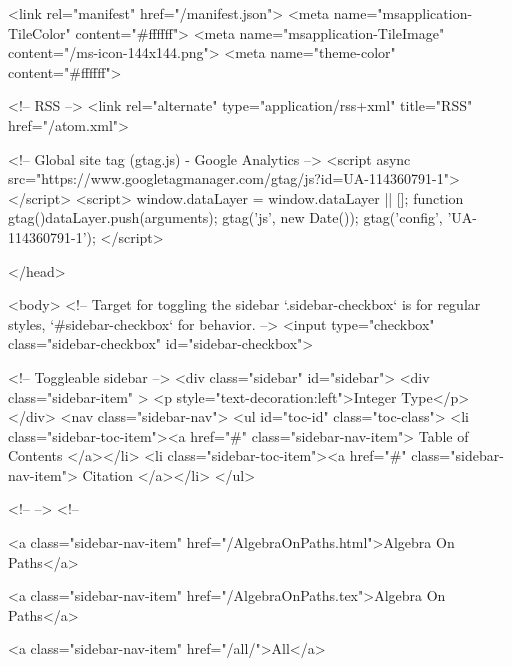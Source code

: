   <link rel="manifest" href="/manifest.json">
  <meta name="msapplication-TileColor" content="#ffffff">
  <meta name="msapplication-TileImage" content="/ms-icon-144x144.png">
  <meta name="theme-color" content="#ffffff">
  
  <!-- RSS -->
  <link rel="alternate" type="application/rss+xml" title="RSS" href="/atom.xml">

  <!-- Global site tag (gtag.js) - Google Analytics -->
  <script async src="https://www.googletagmanager.com/gtag/js?id=UA-114360791-1"></script>
  <script>
    window.dataLayer = window.dataLayer || [];
    function gtag(){dataLayer.push(arguments);}
    gtag('js', new Date());
    gtag('config', 'UA-114360791-1');
  </script>

  
</head>




  <body>
    <!-- Target for toggling the sidebar `.sidebar-checkbox` is for regular
     styles, `#sidebar-checkbox` for behavior. -->
<input type="checkbox" class="sidebar-checkbox" id="sidebar-checkbox">

<!-- Toggleable sidebar -->
<div class="sidebar" id="sidebar">
  <div class="sidebar-item" >
    <p style="text-decoration:left">Integer Type</p>
  </div>
  <nav class="sidebar-nav">
    <ul id="toc-id" class="toc-class">
  <li class="sidebar-toc-item"><a href="#" class="sidebar-nav-item"> Table of Contents </a></li>
  <li class="sidebar-toc-item"><a href="#" class="sidebar-nav-item"> Citation </a></li>
</ul>


    <!--  -->
    <!-- 
      
    
      
    
      
    
      
        
      
    
      
        
          <a class="sidebar-nav-item" href="/AlgebraOnPaths.html">Algebra On Paths</a>
        
      
    
      
        
          <a class="sidebar-nav-item" href="/AlgebraOnPaths.tex">Algebra On Paths</a>
        
      
    
      
        
          <a class="sidebar-nav-item" href="/all/">All</a>
        
      
    
      
        
